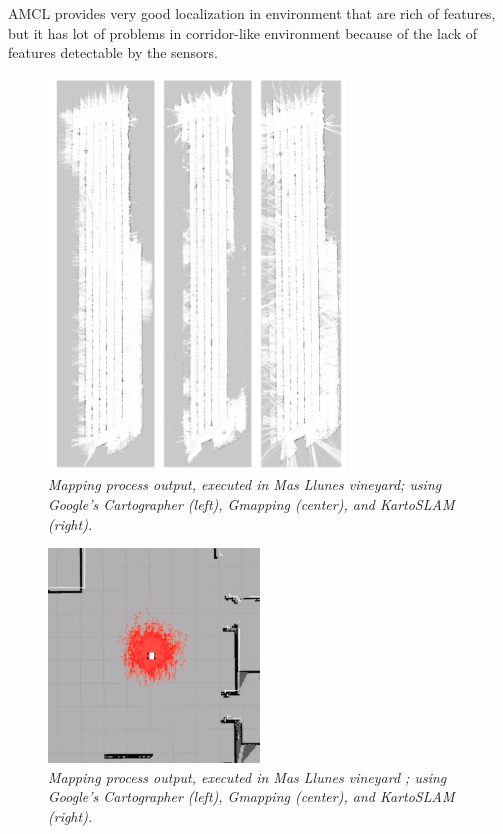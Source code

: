 \ac{AMCL} provides very good localization in environment that are rich of features, but it has lot of problems in corridor-like environment because of the lack of features detectable by the sensors.



\begin{figure}
	\centering
	\includegraphics[width=0.7\textwidth]{Images/localization/vineyardMaps.png}
	\caption{\textit{Mapping process output, executed in Mas Llunes vineyard; using Google's Cartographer (left), Gmapping (center), and KartoSLAM (right).}}
	\label{fig:vineyardMaps}
\end{figure}

\begin{figure}
	\centering
	\includegraphics[width=0.5\textwidth]{Images/localization/amcl.png}
	\caption{\textit{Mapping process output, executed in Mas Llunes vineyard ; using Google's Cartographer (left), Gmapping (center), and KartoSLAM (right).}}
	\label{fig:amclAlgoritmo}
\end{figure}

